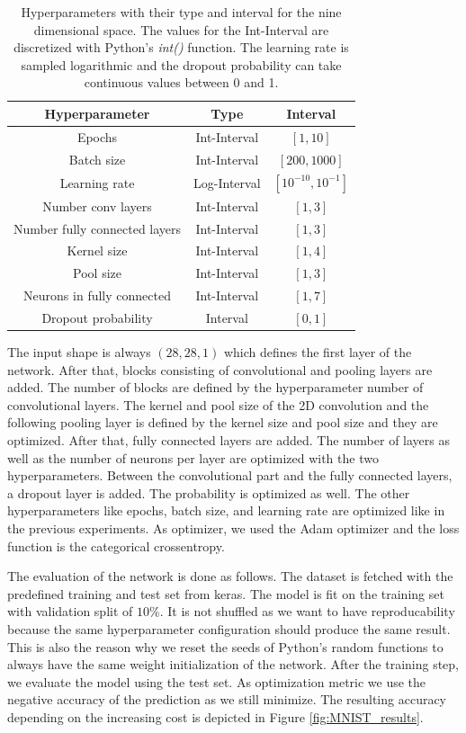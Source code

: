 \begin{table}[htbp!]
	\caption{ Hyperparameters with their type and interval for the nine dimensional space. The values for the Int-Interval are discretized with Python's \textit{int()} function. The learning rate is sampled logarithmic and the dropout probability can take continuous values between 0 and 1. }
	\label{tab:hyperparameter_space_mnist}
	\centering
	\begin{tabular}{| c c c |} 
		\hline
		Hyperparameter & Type & Interval \\ 
		\hline
	 	Epochs & Int-Interval & $ [1,10] $ \\ 
	 	Batch size & Int-Interval & $ [200,1000] $ \\ 
	 	Learning rate & Log-Interval & $ [10^{-10},10^{-1}] $ \\ 
	 	Number conv layers & Int-Interval & $ [1,3] $ \\ 
	 	Number fully connected layers & Int-Interval & $ [1,3] $ \\ 
	 	Kernel size & Int-Interval & $ [1,4] $ \\ 
	 	Pool size & Int-Interval & $ [1,3] $ \\ 
	 	Neurons in fully connected & Int-Interval & $ [1,7] $ \\ 
	 	Dropout probability & Interval & $ [0,1] $ \\ 
		\hline
	\end{tabular}
\end{table}

The input shape is always $ (28, 28, 1) $ which defines the first layer of the network. After that, blocks consisting of convolutional and pooling layers are added. The number of blocks are defined by the hyperparameter number of convolutional layers. The kernel and pool size of the 2D convolution and the following pooling layer is defined by the kernel size and pool size and they are optimized. After that, fully connected layers are added. The number of layers as well as the number of neurons per layer are optimized with the two hyperparameters. Between the convolutional part and the fully connected layers, a dropout layer is added. The probability is optimized as well. The other hyperparameters like epochs, batch size, and learning rate are optimized like in the previous experiments. As optimizer, we used the Adam optimizer and the loss function is the categorical crossentropy. \newline 

The evaluation of the network is done as follows. The dataset is fetched with the predefined training and test set from keras. The model is fit on the training set with validation split of $ 10\% $. It is not shuffled as we want to have reproducability because the same hyperparameter configuration should produce the same result. This is also the reason why we reset the seeds of Python's random functions to always have the same weight initialization of the network. After the training step, we evaluate the model using the test set. As optimization metric we use the negative accuracy of the prediction as we still minimize. The resulting accuracy depending on the increasing cost is depicted in Figure \ref{fig:MNIST_results}.




